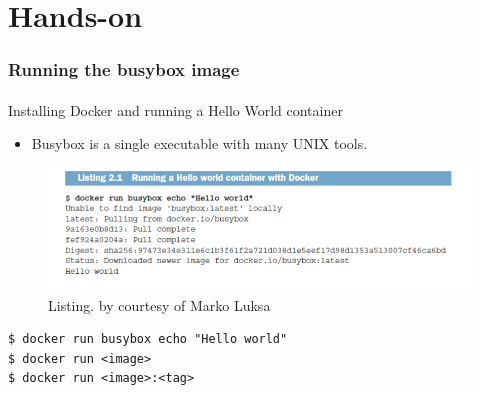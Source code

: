 \section[Hands-on]{Hands-on}
\begin{frame}[fragile]
	\frametitle{Running the busybox image}
	\framesubtitle{}
	Installing Docker and running a Hello World container
	\begin{itemize}
		\item Busybox is a single executable with many UNIX tools.
	\end{itemize}
	\begin{figure}[htbp!]
		\includegraphics[width=1\textwidth]{listings/2_1.png}
		\caption{Listing. by courtesy of Marko Luksa\cite{Luksa2018}}
		\label{fig:}
	\end{figure}
	\begin{lstlisting}[numbers=none, basicstyle=\ttfamily]
$ docker run busybox echo "Hello world"
$ docker run <image>
$ docker run <image>:<tag>
	\end{lstlisting}
\end{frame}


